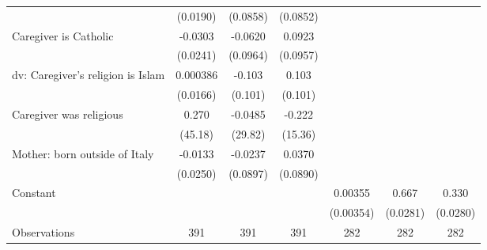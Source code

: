 {\begin{tabular}{l*{6}{c}}
                    &    (0.0190)         &    (0.0858)         &    (0.0852)         &                     &                     &                     \\
\addlinespace
Caregiver is Catholic&     -0.0303         &     -0.0620         &      0.0923         &                     &                     &                     \\
                    &    (0.0241)         &    (0.0964)         &    (0.0957)         &                     &                     &                     \\
\addlinespace
dv: Caregiver's religion is Islam&    0.000386         &      -0.103         &       0.103         &                     &                     &                     \\
                    &    (0.0166)         &     (0.101)         &     (0.101)         &                     &                     &                     \\
\addlinespace
Caregiver was religious&       0.270         &     -0.0485         &      -0.222         &                     &                     &                     \\
                    &     (45.18)         &     (29.82)         &     (15.36)         &                     &                     &                     \\
\addlinespace
Mother: born outside of Italy&     -0.0133         &     -0.0237         &      0.0370         &                     &                     &                     \\
                    &    (0.0250)         &    (0.0897)         &    (0.0890)         &                     &                     &                     \\
\addlinespace
Constant            &                     &                     &                     &     0.00355         &       0.667\sym{***}&       0.330\sym{***}\\
                    &                     &                     &                     &   (0.00354)         &    (0.0281)         &    (0.0280)         \\
\midrule
Observations        &         391         &         391         &         391         &         282         &         282         &         282         \\
\bottomrule
\end{tabular}
}
